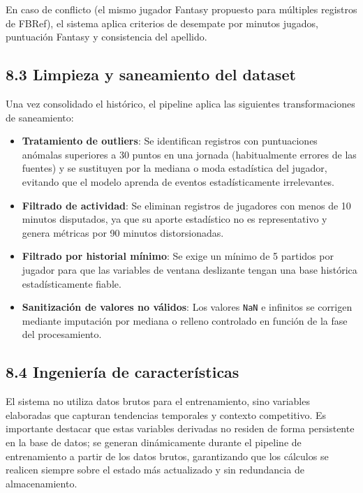 En caso de conflicto (el mismo jugador Fantasy propuesto para múltiples registros de FBRef),
el sistema aplica criterios de desempate por minutos jugados, puntuación Fantasy y
consistencia del apellido.
 
\subsection{8.3 Limpieza y saneamiento del dataset}
 
Una vez consolidado el histórico, el pipeline aplica las siguientes transformaciones de
saneamiento:
 
\begin{itemize}
    \item \textbf{Tratamiento de outliers}: Se identifican registros con puntuaciones
    anómalas superiores a 30 puntos en una jornada (habitualmente errores de las fuentes) y
    se sustituyen por la mediana o moda estadística del jugador, evitando que el modelo
    aprenda de eventos estadísticamente irrelevantes.
 
    \item \textbf{Filtrado de actividad}: Se eliminan registros de jugadores con menos de
    10 minutos disputados, ya que su aporte estadístico no es representativo y genera
    métricas por 90 minutos distorsionadas.
 
    \item \textbf{Filtrado por historial mínimo}: Se exige un mínimo de 5 partidos por
    jugador para que las variables de ventana deslizante tengan una base histórica
    estadísticamente fiable.
 
    \item \textbf{Sanitización de valores no válidos}: Los valores \texttt{NaN} e
    infinitos se corrigen mediante imputación por mediana o relleno controlado en función
    de la fase del procesamiento.
\end{itemize}
 
\subsection{8.4 Ingeniería de características}
 
El sistema no utiliza datos brutos para el entrenamiento, sino variables elaboradas que
capturan tendencias temporales y contexto competitivo. Es importante destacar que estas
variables derivadas no residen de forma persistente en la base de datos; se generan
dinámicamente durante el pipeline de entrenamiento a partir de los datos brutos, garantizando
que los cálculos se realicen siempre sobre el estado más actualizado y sin redundancia de
almacenamiento.
 

